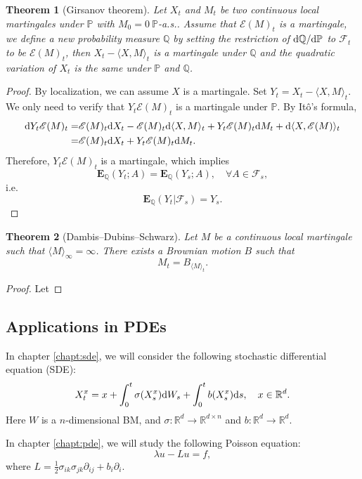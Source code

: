 \documentclass[twoside, 12pt]{book}
\numberwithin{equation}{chapter}
\newtheorem{theorem}{Theorem}[section]
\def\cF{{\mathcal F}}
\def\mP{{\mathbb P}}
\def\mQ{{\mathbb Q}}
\def\mR{{\mathbb R}}
\def\bE{{\mathbf E}}
\def\sE{{\mathscr E}}
\def\<{\langle}
\def\>{\rangle}
\def\p{\partial}
\def\d{\text{\rm{d}}}
\begin{document}
	\begin{theorem}[Girsanov theorem]
		Let $X_t$ and $M_t$ be two continuous local martingales under $\mP$ with $M_0=0 ~  \mP$-a.s..  Assume that $\sE(M)_t$ is a martingale, we define a new probability measure $\mQ$ by setting the restriction of $\d\mQ/\d\mP$ to $\cF_t$ to be $\sE(M)_t$, then $X_t-\langle X, M \rangle_t$ is a martingale under $\mQ$ and the quadratic variation of $X_t$ is the same under $\mP$ and $\mQ$. 
	\end{theorem}
	\begin{proof}
		By localization, we can assume $X$ is a martingale. Set $Y_t=X_t-\<X,M\>_t$. We only need to verify that $Y_t\sE(M)_t$ is a martingale under $\mP$. By Itô's formula, 
		\[
		  \begin{aligned}
		  	\d Y_t \sE(M)_t=& \sE(M)_t \d X_t- \sE(M)_t \d \<X,M\>_t+ Y_t \sE(M)_t \d M_t+ \d \<X, \sE(M)\>_t \\
		  	=& \sE(M)_t \d X_t+ Y_t \sE(M)_t \d M_t. 
		  \end{aligned}
		\]
		Therefore, $Y_t\sE(M)_t$ is a martingale, which implies 
		$$
		    \bE_{\mQ} (Y_t; A) = \bE_{\mQ} (Y_s; A), \quad \forall A\in \cF_s, 
		$$
		i.e. 
		\[
		    \bE_{\mQ}(Y_t|\cF_s)= Y_s. 
		\]
	\end{proof}
	
	\begin{theorem}[Dambis–Dubins–Schwarz]
		Let $M$ be a continuous local martingale such that $\<M\>_\infty=\infty$. There exists a Brownian motion $B$ such that 
		$$
		    M_t=B_{\<M\>_t}. 
		$$
	\end{theorem}\label{thm:DDS}
	\begin{proof}
		Let 
	\end{proof}
	
	\subsection{Applications in PDEs}
	In chapter \ref{chapt:sde}, we will consider the following stochastic differential equation (SDE): 
	\[
	   X_t^x=x+\int_0^t \sigma(X^x_s) \d W_s+ \int_0^t b(X^x_s) \d s, \quad x\in \mR^d.
	\]
    Here $W$ is a $n$-dimensional BM, and $\sigma: \mR^d \to \mR^{d\times n}$ and $b:\mR^d\to \mR^d$. 
    
	In chapter \ref{chapt:pde}, we will study the following Poisson equation: 
	\[
	    \lambda u - L u =f, 
	\]
	where $L=\frac{1}{2}\sigma_{ik}\sigma_{jk}\p_{ij}+b_i\p_i$. 
	
\end{document}
